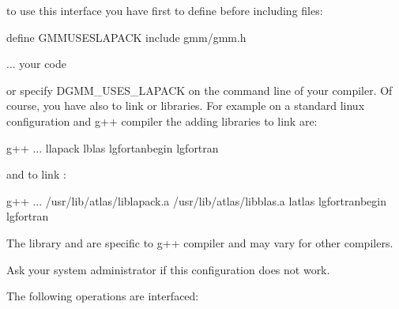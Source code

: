 \documentclass[a4paper,11pt,english]{sphinxmanual}
\begin{document}
\sphinxAtStartPar
to use this interface you have first to define  before including  files:

\begin{sphinxVerbatim}[commandchars=\\\{\}]
\PYGZsh{}define GMM\PYGZus{}USES\PYGZus{}LAPACK
\PYGZsh{}include \PYGZlt{}gmm/gmm.h\PYGZgt{}

... your code
\end{sphinxVerbatim}

\sphinxAtStartPar
or specify \sphinxhyphen{}DGMM\_USES\_LAPACK on the command line of your compiler. Of course, you have also to link  or  libraries. For example on a standard linux configuration and g++ compiler the adding libraries to link  are:

\begin{sphinxVerbatim}[commandchars=\\\{\}]
g++ ...  \PYGZhy{}llapack \PYGZhy{}lblas \PYGZhy{}lgfortanbegin \PYGZhy{}lgfortran
\end{sphinxVerbatim}

\sphinxAtStartPar
and to link  :

\begin{sphinxVerbatim}[commandchars=\\\{\}]
g++ ... /usr/lib/atlas/liblapack.a /usr/lib/atlas/libblas.a \PYGZhy{}latlas \PYGZhy{}lgfortranbegin \PYGZhy{}lgfortran
\end{sphinxVerbatim}

\sphinxAtStartPar
The library  and  are specific to g++ compiler and may vary for other compilers.

\sphinxAtStartPar
Ask your system administrator if this configuration does not work.

\sphinxAtStartPar
The following operations are interfaced:
\end{document}
